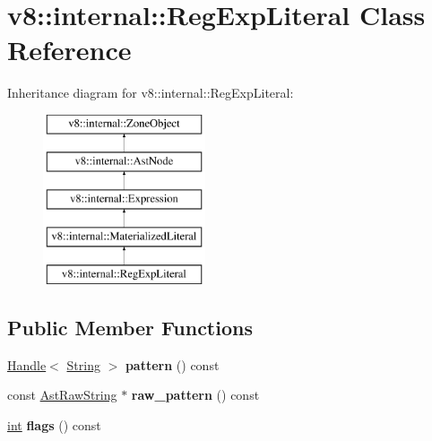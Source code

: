 \hypertarget{classv8_1_1internal_1_1RegExpLiteral}{}\section{v8\+:\+:internal\+:\+:Reg\+Exp\+Literal Class Reference}
\label{classv8_1_1internal_1_1RegExpLiteral}
Inheritance diagram for v8\+:\+:internal\+:\+:Reg\+Exp\+Literal\+:\begin{figure}[H]
\begin{center}
\leavevmode
\includegraphics[height=5.000000cm]{classv8_1_1internal_1_1RegExpLiteral}
\end{center}
\end{figure}
\subsection*{Public Member Functions}
\begin{DoxyCompactItemize}
\item 
\mbox{\label{classv8_1_1internal_1_1RegExpLiteral_af7558033a83e4c6ab68f9a129c773944}} 
\mbox{\hyperlink{classv8_1_1internal_1_1Handle}{Handle}}$<$ \mbox{\hyperlink{classv8_1_1internal_1_1String}{String}} $>$ {\bfseries pattern} () const
\item 
\mbox{\label{classv8_1_1internal_1_1RegExpLiteral_a522be390165f91b43554398d0c296390}} 
const \mbox{\hyperlink{classv8_1_1internal_1_1AstRawString}{Ast\+Raw\+String}} $\ast$ {\bfseries raw\+\_\+pattern} () const
\item 
\mbox{\label{classv8_1_1internal_1_1RegExpLiteral_adf9215918cd8282a0374c1683ba58e8d}} 
\mbox{\hyperlink{classint}{int}} {\bfseries flags} () const
\end{DoxyCompactItemize}
